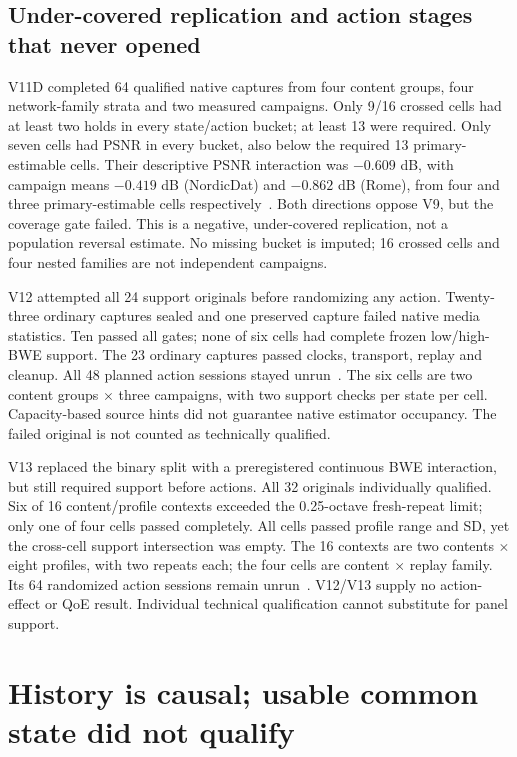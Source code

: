 \documentclass[10pt]{article}
\begin{document}
\subsection{Under-covered replication and action stages that never opened}
V11D completed 64 qualified native captures from four content groups, four
network-family strata and two measured campaigns. Only 9/16 crossed cells had
at least two holds in every state/action bucket; at least 13 were required.
Only seven cells had PSNR in every bucket, also below the required 13
primary-estimable cells. Their descriptive PSNR interaction was $-0.609$ dB,
with campaign means $-0.419$ dB (NordicDat) and $-0.862$ dB (Rome), from four
and three primary-estimable cells respectively~\cite{v11d}. Both directions
oppose V9, but the coverage gate failed. This is a negative, under-covered
replication, not a population reversal estimate. No missing bucket is imputed;
16 crossed cells and four nested families are not independent campaigns.

V12 attempted all 24 support originals before randomizing any action.
Twenty-three ordinary captures sealed and one preserved capture failed native
media statistics. Ten passed all gates; none of six cells had complete frozen
low/high-BWE support. The 23 ordinary captures passed clocks, transport, replay
and cleanup. All 48 planned action sessions stayed unrun~\cite{v12}.
The six cells are two content groups $\times$ three campaigns, with two support
checks per state per cell. Capacity-based source hints did not guarantee native
estimator occupancy. The failed original is not counted as technically qualified.

V13 replaced the binary split with a preregistered continuous BWE interaction,
but still required support before actions. All 32 originals individually
qualified. Six of 16 content/profile contexts exceeded the 0.25-octave fresh-repeat
limit; only one of four cells passed completely. All cells passed profile range
and SD, yet the cross-cell support intersection was empty. The 16 contexts are
two contents $\times$ eight profiles, with two repeats each; the four cells are
content $\times$ replay family. Its 64 randomized action sessions remain
unrun~\cite{v13}. V12/V13 supply no action-effect or QoE result. Individual
technical qualification cannot substitute for panel support.

\section{History is causal; usable common state did not qualify}
\end{document}

